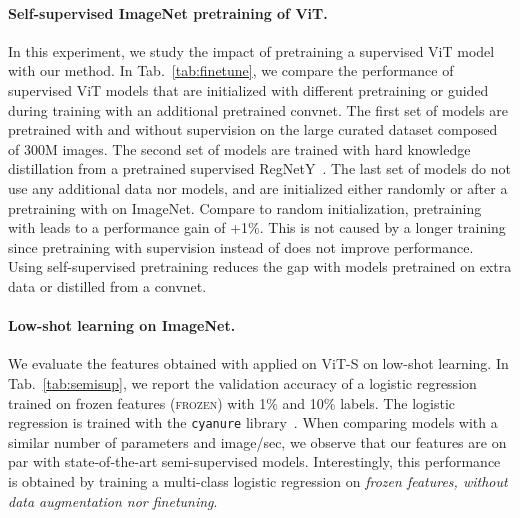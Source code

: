 \paragraph{Self-supervised ImageNet pretraining of ViT.}
In this experiment, we study the impact of pretraining a supervised ViT model with our method.
In Tab.~\ref{tab:finetune}, we compare the performance of supervised ViT models that are initialized with different pretraining or guided during training with an additional pretrained convnet.
The first set of models are pretrained with and without supervision on the large curated dataset composed of 300M images.
The second set of models are trained with hard knowledge distillation from a pretrained supervised RegNetY~\cite{radosavovic2020designing}.
The last set of models do not use any additional data nor models, and are initialized either randomly or after a pretraining with \OURS on ImageNet.
Compare to random initialization, pretraining with \OURS leads to a performance gain of +1\%.
This is not caused by a longer training since pretraining with supervision instead of \OURS does not improve performance.
Using self-supervised pretraining reduces the gap with models pretrained on extra data or distilled from a convnet.

\paragraph{Low-shot learning on ImageNet.}
We evaluate the features obtained with \OURS applied on ViT-S on low-shot learning.
In Tab.~\ref{tab:semisup}, we report the validation accuracy of a logistic regression trained on frozen features (\textsc{frozen}) with 1\% and 10\% labels.
The logistic regression is trained with the \texttt{cyanure} library~\cite{mairal2019cyanure}.
When comparing models with a similar number of parameters and image/sec, we observe that our features are on par with state-of-the-art semi-supervised models.
Interestingly, this performance is obtained by training a multi-class logistic regression on \emph{frozen features, without data augmentation nor finetuning}.

